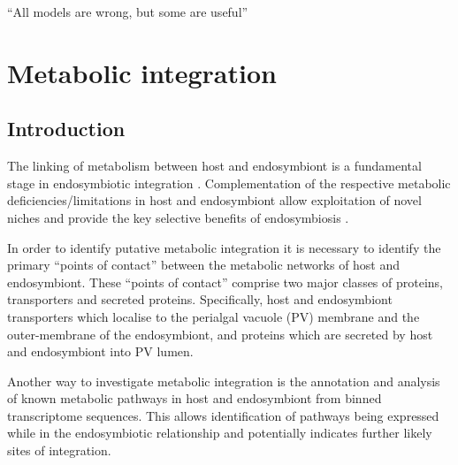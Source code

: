 \graphicspath{{chapters/5.Chapter_3/figures/}}

\begin{savequote}[75mm]
``All models are wrong, but some are useful''
\end{savequote}

\chapter{Metabolic integration}

\section{Introduction}

The linking of metabolism between host and endosymbiont is a fundamental 
stage in endosymbiotic integration \citep{Bhattacharya2007,Karkar2015a}.
Complementation of the respective metabolic deficiencies/limitations in
host and endosymbiont allow exploitation of novel niches and provide
the key selective benefits of endosymbiosis \citep{Hoffmeister2003}.

In order to identify putative metabolic integration it is necessary to
identify the primary ``points of contact'' between the metabolic networks 
of host and endosymbiont. These ``points of contact'' comprise two
major classes of proteins, transporters and secreted proteins. 
Specifically, host and endosymbiont transporters which localise to the
perialgal vacuole (PV) membrane and the outer-membrane of the endosymbiont,
and proteins which are secreted by host and endosymbiont into 
PV lumen.  

Another way to investigate metabolic integration is the annotation and analysis
of known metabolic pathways in host and endosymbiont from binned transcriptome
sequences.  This allows identification of pathways being expressed while
in the endosymbiotic relationship and potentially indicates further likely
sites of integration.


%

